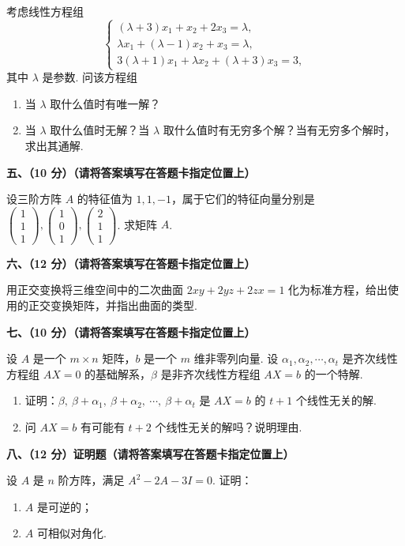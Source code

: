 \documentclass[a4paper,11pt]{ctexart}
\begin{document}
考虑线性方程组
\[
  \begin{cases}
    (\lambda + 3)x_1 + x_2 + 2x_3 = \lambda, \\
    \lambda x_1 + (\lambda - 1)x_2 + x_3 = \lambda, \\
    3(\lambda + 1)x_1 + \lambda x_2 + (\lambda + 3)x_3 = 3,
  \end{cases}
\]
其中 $\lambda$ 是参数. 问该方程组
\begin{enumerate}[label=(\arabic*), leftmargin=2.4em, itemsep=0.25em, topsep=0.3em]
  \item 当 $\lambda$ 取什么值时有唯一解？
  \item 当 $\lambda$ 取什么值时无解？当 $\lambda$ 取什么值时有无穷多个解？当有无穷多个解时，求出其通解.
\end{enumerate}

\vspace{0.7em}

\textbf{五、（10 分）（请将答案填写在答题卡指定位置上）}

设三阶方阵 $A$ 的特征值为 $1, 1, -1$，属于它们的特征向量分别是 $\begin{pmatrix} 1 \\ 1 \\ 1 \end{pmatrix}, \begin{pmatrix} 1 \\ 0 \\ 1 \end{pmatrix}, \begin{pmatrix} 2 \\ 1 \\ 1 \end{pmatrix}$. 求矩阵 $A$.

\vspace{0.7em}

\textbf{六、（12 分）（请将答案填写在答题卡指定位置上）}

用正交变换将三维空间中的二次曲面 $2xy + 2yz + 2zx = 1$ 化为标准方程，给出使用的正交变换矩阵，并指出曲面的类型.

\vspace{0.7em}

\textbf{七、（10 分）（请将答案填写在答题卡指定位置上）}

设 $A$ 是一个 $m \times n$ 矩阵，$b$ 是一个 $m$ 维非零列向量. 设 $\alpha_1, \alpha_2, \cdots, \alpha_t$ 是齐次线性方程组 $AX = 0$ 的基础解系，$\beta$ 是非齐次线性方程组 $AX = b$ 的一个特解.
\begin{enumerate}[label=(\arabic*), leftmargin=2.4em, itemsep=0.25em, topsep=0.3em]
  \item 证明：$\beta,\ \beta + \alpha_1,\ \beta + \alpha_2,\ \cdots,\ \beta + \alpha_t$ 是 $AX = b$ 的 $t + 1$ 个线性无关的解.
  \item 问 $AX = b$ 有可能有 $t + 2$ 个线性无关的解吗？说明理由.
\end{enumerate}

\vspace{0.7em}

\textbf{八、（12 分）证明题（请将答案填写在答题卡指定位置上）}

设 $A$ 是 $n$ 阶方阵，满足 $A^2 - 2A - 3I = 0$. 证明：
\begin{enumerate}[label=(\arabic*), leftmargin=2.4em, itemsep=0.25em, topsep=0.3em]
  \item $A$ 是可逆的；
  \item $A$ 可相似对角化.
\end{enumerate}
\end{document}
